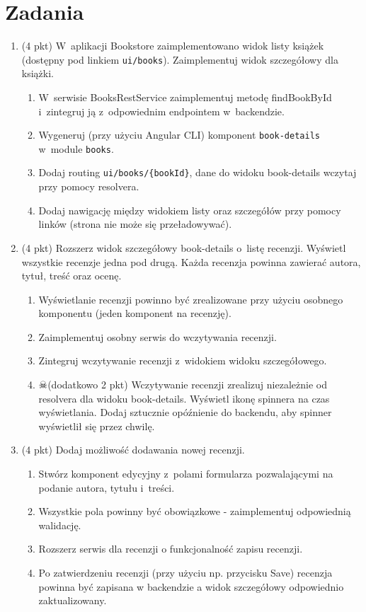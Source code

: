 \documentclass[12pt]{article}
\begin{document}
    \section*{Zadania}
    \begin{enumerate}
	
		\item
			(4 pkt) W~aplikacji Bookstore zaimplementowano widok listy książek (dostępny pod linkiem \texttt{ui/books}). Zaimplementuj widok szczegółowy dla książki.
			\begin{enumerate}
				\item W~serwisie BooksRestService zaimplementuj metodę findBookById i~zintegruj ją z~odpowiednim endpointem w~backendzie.
				\item Wygeneruj (przy użyciu Angular CLI) komponent \texttt{book-details} w~module \texttt{books}.
				\item Dodaj routing \texttt{ui/books/\{bookId\}}, dane do widoku book-details wczytaj przy pomocy resolvera.
				\item Dodaj nawigację między widokiem listy oraz szczegółów przy pomocy linków (strona nie może się przeładowywać).
			\end{enumerate}
			
		\item
			(4 pkt) Rozszerz widok szczegółowy book-details o~listę recenzji. Wyświetl wszystkie recenzje jedna pod drugą. Każda recenzja powinna zawierać autora, tytuł, treść oraz ocenę.
			\begin{enumerate}
				\item Wyświetlanie recenzji powinno być zrealizowane przy użyciu osobnego komponentu (jeden komponent na recenzję).
				\item Zaimplementuj osobny serwis do wczytywania recenzji.
				\item Zintegruj wczytywanie recenzji z~widokiem widoku szczegółowego.
				\item $\skull$(dodatkowo 2 pkt) Wczytywanie recenzji zrealizuj niezależnie od resolvera dla widoku book-details. Wyświetl ikonę spinnera na czas wyświetlania. Dodaj sztucznie opóźnienie do backendu, aby spinner wyświetlił się przez chwilę.
			\end{enumerate}
			
		\item
			(4 pkt) Dodaj możliwość dodawania nowej recenzji.
			\begin{enumerate}
				\item Stwórz komponent edycyjny z~polami formularza pozwalającymi na podanie autora, tytułu i~treści.
				\item Wszystkie pola powinny być obowiązkowe - zaimplementuj odpowiednią walidację.
				\item Rozszerz serwis dla recenzji o funkcjonalność zapisu recenzji.
				\item Po zatwierdzeniu recenzji (przy użyciu np. przycisku Save) recenzja powinna być zapisana w backendzie a widok szczegółowy odpowiednio zaktualizowany.
			\end{enumerate}
			

\end{enumerate}
\end{document}
